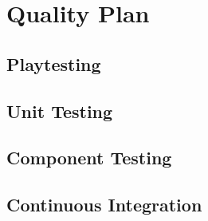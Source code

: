 \section{Quality Plan}
\label{section:quality}

\subsection{Playtesting}

\subsection{Unit Testing}

\subsection{Component Testing}

\subsection{Continuous Integration}